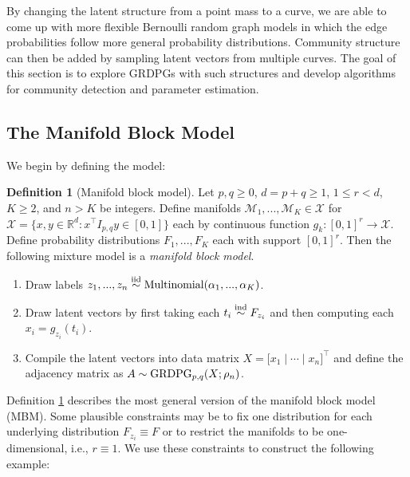 \documentclass[
  12pt,
]{article}
\theoremstyle{definition}
\newtheorem{definition}{Definition}[section]
\theoremstyle{definition}
\theoremstyle{definition}
\theoremstyle{definition}
\theoremstyle{remark}
\begin{document}
By changing the latent structure from a point mass to a curve, we are able to come up with more flexible Bernoulli random graph models in which the edge probabilities follow more general probability distributions.
Community structure can then be added by sampling latent vectors from multiple curves.
The goal of this section is to explore GRDPGs with such structures and develop algorithms for community detection and parameter estimation.

\hypertarget{the-manifold-block-model}{%
\subsection{The Manifold Block Model}\label{the-manifold-block-model}}

We begin by defining the model:

\begin{definition}[Manifold block model]
\label{def:mbm}
Let $p, q \geq 0$, $d = p + q \geq 1$, $1 \leq r < d$, $K \geq 2$, and $n > K$ be integers. 
Define manifolds $\mathcal{M}_1, ..., \mathcal{M}_K \in \mathcal{X}$ for $\mathcal{X} = \{x, y \in \mathbb{R}^d : x^\top I_{p,q} y \in [0, 1]\}$ each by continuous function $g_k : [0, 1]^r \to \mathcal{X}$. 
Define probability distributions $F_1, ..., F_K$ each with support $[0, 1]^r$. 
Then the following mixture model is a {\em manifold block model}.

\begin{enumerate}
\item Draw labels $z_1, ..., z_n \stackrel{\mathrm{iid}}{\sim} \mathrm{Multinomial}(\alpha_1, ..., \alpha_K)$.
\item Draw latent vectors by first taking each $t_i \stackrel{\mathrm{ind}}{\sim} F_{z_i}$ and then computing each $x_i = g_{z_i}(t_i)$. 
\item Compile the latent vectors into data matrix $X = \Big[ x_1 \mid \cdots \mid x_n \Big]^\top$ and define the adjacency matrix as $A \sim \mathrm{GRDPG}_{p,q}(X; \rho_n)$. 
\end{enumerate}
\end{definition}

Definition \ref{def:mbm} describes the most general version of the manifold block model (MBM).
Some plausible constraints may be to fix one distribution for each underlying distribution \(F_{z_i} \equiv F\) or to restrict the manifolds to be one-dimensional, i.e., \(r \equiv 1\).
We use these constraints to construct the following example:
\end{document}
